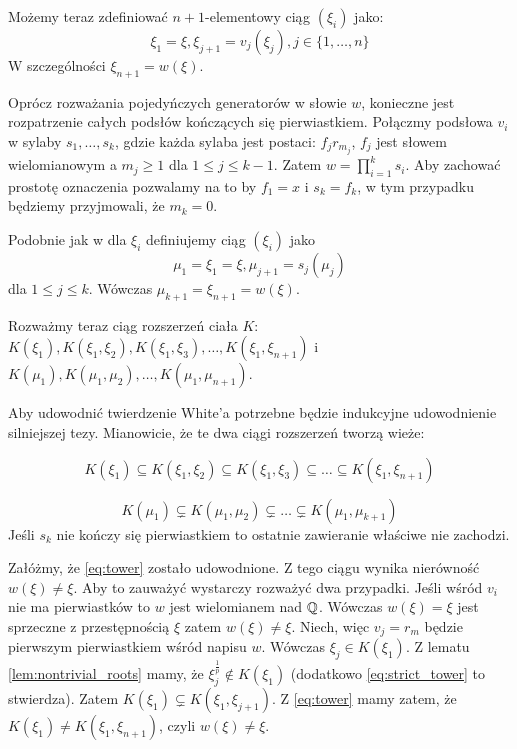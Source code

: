 Możemy teraz zdefiniować $n+1$-elementowy ciąg $\left(\xi_i\right)$ jako:
\[\xi_1 = \xi, \xi_{j+1} = v_j\left(\xi_j\right), j \in \{1, \ldots, n\}\]
W szczególności $\xi_{n+1} = w(\xi)$.

Oprócz rozważania pojedyńczych generatorów w słowie $w$, konieczne jest
rozpatrzenie całych podsłów kończących się pierwiastkiem. Połączmy podsłowa
$v_i$ w sylaby $s_1, \ldots, s_k$, gdzie każda sylaba jest postaci:
$f_jr_{m_j}$, $f_j$ jest słowem wielomianowym a $m_j \geq 1$ dla
$1 \leq j \leq k-1$. Zatem $w = \prod_{i=1}^k s_i$.
Aby zachować prostotę oznaczenia pozwalamy na to by $f_1 = x$  i $s_k = f_k$, w
tym przypadku będziemy przyjmowali, że $m_k = 0$.

Podobnie jak w dla $\xi_i$ definiujemy ciąg $\left(\xi_i\right)$ jako
\[\mu_1 = \xi_1 = \xi, \mu_{j+1} = s_j\left(\mu_j\right)\]
dla $1 \leq j \leq k$. Wówczas $\mu_{k+1} = \xi_{n+1} = w(\xi)$.

Rozważmy teraz ciąg rozszerzeń ciała $K$:
$
K\left(\xi_1\right),
K\left(\xi_1, \xi_2\right),
K\left(\xi_1, \xi_3\right),
\ldots,
K\left(\xi_1, \xi_{n+1}\right)$ i
$
K\left(\mu_1\right),
K\left(\mu_1, \mu_2\right),
\ldots,
K\left(\mu_1, \mu_{n+1}\right)$.

Aby udowodnić twierdzenie White'a potrzebne będzie indukcyjne udowodnienie
silniejszej tezy. Mianowicie, że te dwa ciągi rozszerzeń tworzą wieże:

\begin{equation}
K\left(\xi_1\right) \subseteq
K\left(\xi_1, \xi_2\right) \subseteq
K\left(\xi_1, \xi_3\right) \subseteq
\ldots
\subseteq
K\left(\xi_1, \xi_{n+1}\right)
\label{eq:tower}
\end{equation}

\begin{equation}
  K(\mu_1) \subsetneq
  K(\mu_1, \mu_2) \subsetneq
  \ldots \subsetneq
  K(\mu_1, \mu_{k+1})
  \label{eq:strict_tower}
\end{equation}
Jeśli $s_k$ nie kończy się pierwiastkiem to ostatnie zawieranie właściwe nie
zachodzi.

Załóżmy, że \ref{eq:tower} zostało udowodnione. Z tego ciągu wynika nierówność
$w\left(\xi\right) \neq \xi$. Aby to zauważyć wystarczy rozważyć dwa przypadki.
Jeśli wśród $v_i$ nie ma pierwiastków to $w$ jest wielomianem nad $\mathbb{Q}$. Wówczas
$w(\xi) = \xi$ jest sprzeczne z przestępnością $\xi$ zatem $w(\xi) \neq \xi$.
Niech, więc $v_j = r_m$ będzie pierwszym pierwiastkiem wśród napisu $w$. Wówczas
$\xi_j \in K\left(\xi_1\right)$. Z lematu \ref{lem:nontrivial_roots} mamy, że
$\xi_{j}^{\frac{1}{p}} \not \in K(\xi_1)$ (dodatkowo \ref{eq:strict_tower} to
stwierdza). Zatem $K\left(\xi_1\right) \subsetneq K\left(\xi_1,
\xi_{j+1}\right)$. Z \ref{eq:tower} mamy zatem, że $K\left(\xi_1\right) \neq
K\left(\xi_1, \xi_{n+1}\right)$, czyli $w(\xi) \neq \xi$.

